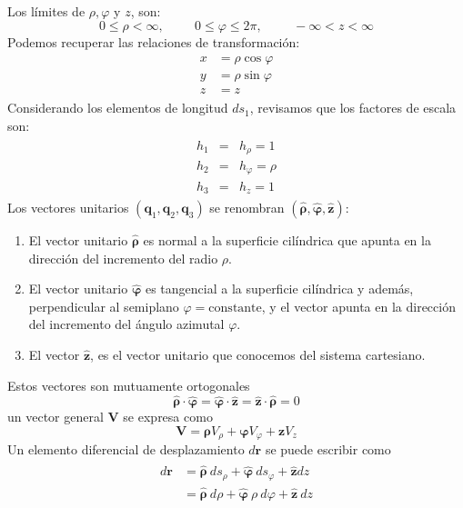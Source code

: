 Los límites de $\rho, \varphi$ y $z$, son:
\[ 0 \leq \rho < \infty, \hspace{1cm} 0 \leq \varphi \leq 2 \pi, \hspace{1cm} -\infty < z < \infty \]
Podemos recuperar las relaciones de transformación:
\begin{eqnarray}
\begin{aligned}
x &= \rho \cos \varphi \\
y &= \rho \sin \varphi \\
z &= z
\end{aligned}
\end{eqnarray}
Considerando los elementos de longitud $ds_{1}$, revisamos que los factores de escala son:
\begin{eqnarray}
\begin{aligned}
h_{1} &=& h_{\rho} = 1 \\
h_{2} &=& h_{\varphi} = \rho \\
h_{3} &=& h_{z} = 1
\end{aligned}
\end{eqnarray}
Los vectores unitarios $(\mathbf{q}_{1},\mathbf{q}_{2},\mathbf{q}_{3})$ se renombran $(\bm{\hat{\rho}},\bm{\hat{\varphi}},\mathbf{\hat{z}})$:
\begin{enumerate}
\item El vector unitario $\bm{\hat{\rho}}$ es normal a la superficie cilíndrica que apunta en la dirección del incremento del radio $\rho$.
\item El vector unitario $\bm{\hat{\varphi}}$ es tangencial a la superficie cilíndrica y además, perpendicular al semiplano $\varphi=\text{constante}$, y el vector apunta en la dirección del incremento del ángulo azimutal $\varphi$.
\item El vector $\mathbf{\hat{z}}$, es el vector unitario que conocemos del sistema cartesiano.
\end{enumerate}
Estos vectores son mutuamente ortogonales
\[ \bm{\widehat{\rho}} \cdot \bm{\widehat{\varphi}} = \bm{\widehat{\varphi}} \cdot \mathbf{\widehat{z}} = \mathbf{\widehat{z}} \cdot \bm{\widehat{\rho}} = 0  \]
un vector general $\mathbf{V}$ se expresa como
\[ \mathbf{V} =  \bm{\rho} V_{\rho} + \bm{\varphi} V_{\varphi} + \mathbf{z} V_{z} \]
Un elemento diferencial de desplazamiento $d \mathbf{r}$ se puede escribir como
\begin{eqnarray}
\begin{aligned}
d \mathbf{r} &= \bm{\hat{\rho}} \: ds_{\rho} + \bm{\hat{\varphi}} \: ds_{\varphi} + \mathbf{\hat{z}} dz \\
&= \bm{\hat{\rho}} \: d \rho + \bm{\hat{\varphi}} \: \rho \: d \varphi + \mathbf{\hat{z}} \: dz
\end{aligned}
\end{eqnarray}
